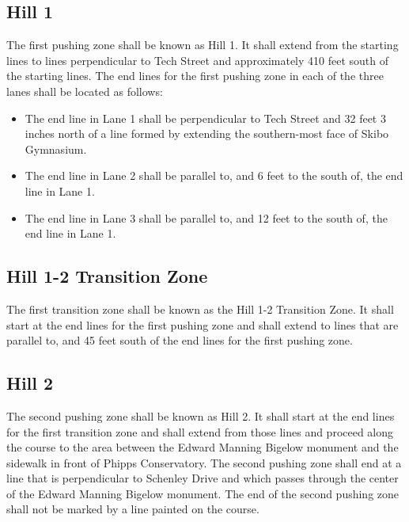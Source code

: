 \subsection{Hill 1}

	The first pushing zone shall be known as Hill 1. It shall extend from the
	starting lines to lines perpendicular to Tech Street and approximately 410 feet
	south of the starting lines. The end lines for the first pushing zone in each
	of the three lanes shall be located as follows:

	\begin{itemize}
	
		\item
		The end line in Lane 1 shall be perpendicular to Tech Street and 32 feet 3
		inches north of a line formed by extending the southern-most face of Skibo
		Gymnasium.

		\item
		The end line in Lane 2 shall be parallel to, and 6 feet to the south of, the
		end line in Lane 1.
		
		\item
		The end line in Lane 3 shall be parallel to, and 12 feet to the south of, the
		end line in Lane 1.

	\end{itemize}

\subsection{Hill 1-2 Transition Zone}

	The first transition zone shall be known as the Hill 1-2 Transition Zone. It
	shall start at the end lines for the first pushing zone and shall extend to
	lines that are parallel to, and 45 feet south of the end lines for the first
	pushing zone.

\subsection{Hill 2}

	The second pushing zone shall be known as Hill 2. It shall start at the end
	lines for the first transition zone and shall extend from those lines and
	proceed along the course to the area between the Edward Manning Bigelow
	monument and the sidewalk in front of Phipps Conservatory. The second pushing
	zone shall end at a line that is perpendicular to Schenley Drive and which
	passes through the center of the Edward Manning Bigelow monument. The end of
	the second pushing zone shall not be marked by a line painted on the course.

